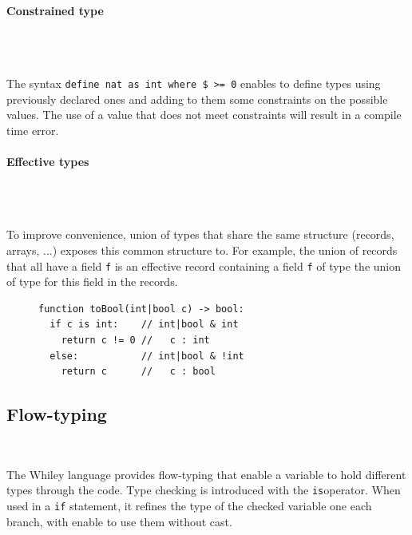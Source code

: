 \documentclass[10pt,a4paper]{article}
\newcommand{\code}{\texttt}
\renewcommand{\indent}{~\\\vspace{-.8cm}}
\newcommand{\pindent}{~\\\indent}
\begin{document}
\paragraph{Constrained type}\pindent

The syntax \lstinline[language=Whiley,basicstyle=\normalsize\ttfamily]{define nat as int where $ >= 0}  enables to define types using previously declared ones and adding to them some constraints on the possible values. The use of a value that does not meet constraints will result in a compile time error.





\paragraph{Effective types} \pindent

To improve convenience, union of types that share the same structure (records, arrays, ...) exposes this common structure to. For example, the union of records that all have a field \code f is an effective record containing a field \code f of type the union of type for this field in the records.



\begin{figure}
	\vspace{-.5cm}
\begin{lstlisting}[language=Whiley]
function toBool(int|bool c) -> bool:
  if c is int:    // int|bool & int
    return c != 0 //   c : int
  else:           // int|bool & !int 
    return c      //   c : bool
\end{lstlisting}
\end{figure}

\subsection{Flow-typing}
\indent

The Whiley language provides flow-typing that enable a variable to hold different types through the code. 
Type checking is introduced with the \code {is}operator. When used in a \code {if} statement, it refines the type of the checked variable one each branch, with enable to use them without cast. \\
\end{document}
